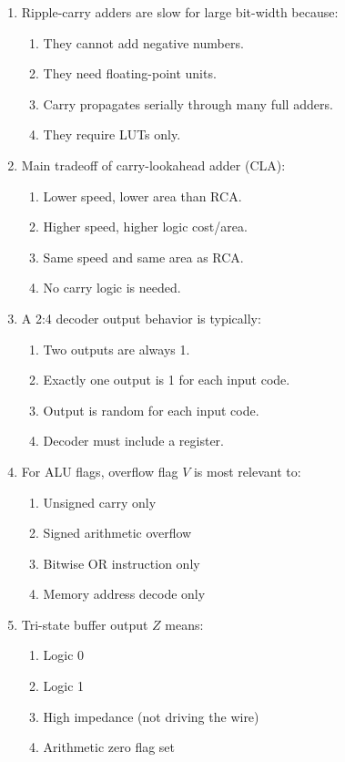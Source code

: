 \documentclass[11pt]{article}
\begin{document}
\begin{enumerate}[label=\textbf{A\arabic*.}]
  \item Ripple-carry adders are slow for large bit-width because:
  \begin{enumerate}[label=(\Alph*)]
    \item They cannot add negative numbers.
    \item They need floating-point units.
    \item Carry propagates serially through many full adders.
    \item They require LUTs only.
  \end{enumerate}

  \item Main tradeoff of carry-lookahead adder (CLA):
  \begin{enumerate}[label=(\Alph*)]
    \item Lower speed, lower area than RCA.
    \item Higher speed, higher logic cost/area.
    \item Same speed and same area as RCA.
    \item No carry logic is needed.
  \end{enumerate}

  \item A 2:4 decoder output behavior is typically:
  \begin{enumerate}[label=(\Alph*)]
    \item Two outputs are always 1.
    \item Exactly one output is 1 for each input code.
    \item Output is random for each input code.
    \item Decoder must include a register.
  \end{enumerate}

  \item For ALU flags, overflow flag $V$ is most relevant to:
  \begin{enumerate}[label=(\Alph*)]
    \item Unsigned carry only
    \item Signed arithmetic overflow
    \item Bitwise OR instruction only
    \item Memory address decode only
  \end{enumerate}

  \item Tri-state buffer output $Z$ means:
  \begin{enumerate}[label=(\Alph*)]
    \item Logic 0
    \item Logic 1
    \item High impedance (not driving the wire)
    \item Arithmetic zero flag set
  \end{enumerate}
\end{enumerate}
\end{document}
